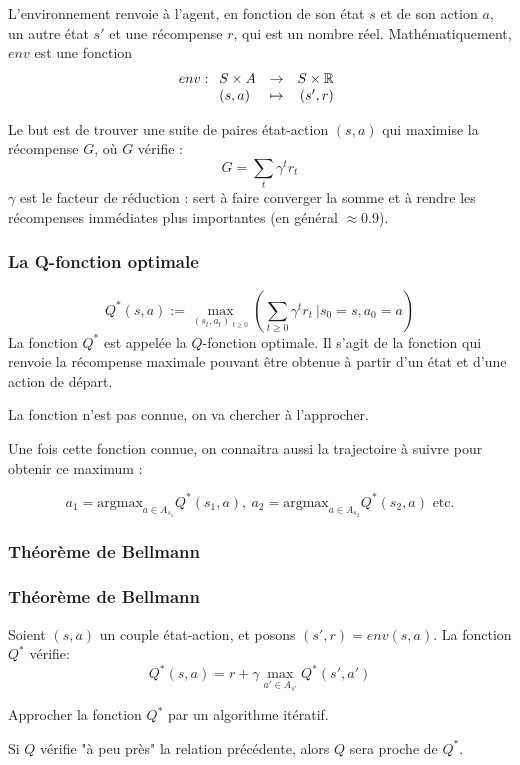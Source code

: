\documentclass{beamer}
\newcommand{\R}{\mathbb{R}}
\begin{document}
\begin{frame}
L'environnement renvoie à l'agent, en fonction de son état $s$ et de son action $a$, un autre état $s'$ et une récompense $r$, qui est un nombre réel. Mathématiquement, $env$ est une fonction $$env :\begin{array}[t]{lcr}
S\times A &\rightarrow& S \times \R\\
(s,a) & \mapsto & (s', r)\\\end{array}$$\medskip \pause

Le but est de trouver une suite de paires état-action $(s,a)$ qui maximise la récompense $G$, où $G$ vérifie :
$$G = \sum_{t} \gamma ^t r_t$$\pause
$\gamma$ est le facteur de réduction : sert à faire converger la somme et à rendre les récompenses immédiates plus importantes (en général $\approx 0.9$).
\end{frame}

\begin{frame}
\frametitle{La Q-fonction optimale}
$$
Q^{*}(s,a) := \max_{ (s_t,a_t)\ _{t\geq 0}}\left( \sum_{t\geq 0} \gamma^t r_t  \ \big | s_0=s,a_0=a\right)
$$
\pause
La fonction $Q^{*}$ est appelée la $Q$-fonction optimale. Il s'agit de la fonction qui renvoie la récompense maximale pouvant être obtenue à partir d'un état et d'une action de départ. \pause

La fonction n'est pas connue, on va chercher à l'approcher. 

Une fois cette fonction connue, on connaitra aussi la trajectoire à suivre pour obtenir ce maximum :

$$
a_1 = \text{argmax}_{a\in A_{s_1}} Q^{*}(s_1,a), ~ a_2 = \text{argmax}_{a\in A_{s_2}} Q^{*}(s_2,a) \text{ etc}.
$$
\end{frame}

\subsubsection{Théorème de Bellmann}
\begin{frame}
\frametitle{Théorème de Bellmann}
Soient $(s,a)$ un couple état-action, et posons $(s',r)= env(s,a)$.  La fonction $Q^{*}$ vérifie:   
$$
Q^{*}(s,a) = r + \gamma \max_{a'\in A_{s'}} Q^{*}(s',a')
$$\pause

Approcher la fonction $Q^*$ par un algorithme itératif. 

Si $Q$ vérifie "à peu près" la relation précédente, alors $Q$ sera proche de $Q^*$. 
\end{frame}
\end{document}
